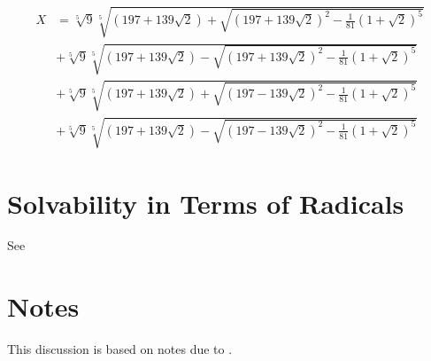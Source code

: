 \[
\begin{aligned}
X &= \sqrt[5]{9}\sqrt[5]{(197 + 139 \sqrt{2}) + \sqrt{(197+139\sqrt{2})^2
    -\frac{1}{81}(1 + \sqrt{2})^5}} \\
 &+ \sqrt[5]{9}\sqrt[5]{(197 + 139 \sqrt{2}) - \sqrt{(197+139\sqrt{2})^2
    -\frac{1}{81}(1 + \sqrt{2})^5}} \\
 &+ \sqrt[5]{9}\sqrt[5]{(197 + 139 \sqrt{2}) + \sqrt{(197-139\sqrt{2})^2
    -\frac{1}{81}(1 + \sqrt{2})^5}} \\
 &+ \sqrt[5]{9} \sqrt[5]{(197 + 139 \sqrt{2}) - \sqrt{(197-139\sqrt{2})^2
    -\frac{1}{81}(1 + \sqrt{2})^5}}
\end{aligned}
\]

\section{Solvability in Terms of Radicals}

See \cite{Young88,Cayley??}

\section*{Notes}

\footnotesize

 This discussion is based on notes due
to {\Trager}. 

\normalsize
